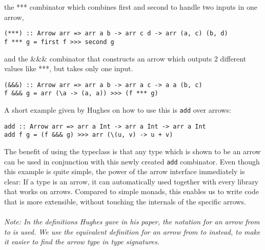 the *** combinator which combines first and second to handle two inputs in one arrow,
\begin{lstlisting}[frame=htrbl]
(***) :: Arrow arr => arr a b -> arr c d -> arr (a, c) (b, d)
f *** g = first f >>> second g
\end{lstlisting}
and the \&\&\& combinator that constructs an arrow which outputs 2 different values like ***, but takes only one input.
\begin{lstlisting}[frame=htrbl]
(&&&) :: Arrow arr => arr a b -> arr a c -> a a (b, c)
f &&& g = arr (\a -> (a, a)) >>> (f *** g)
\end{lstlisting}
A short example given by Hughes on how to use this is \lstinline{add} over arrows:
\begin{lstlisting}[frame=htrbl]
add :: Arrow arr => arr a Int -> arr a Int -> arr a Int
add f g = (f &&& g) >>> arr (\(u, v) -> u + v)
\end{lstlisting}
The benefit of using the  typeclass is that any type which is shown to be an arrow can be used in conjunction with this newly created \lstinline{add} combinator. Even though this example is quite simple, the power of the arrow interface immediately is clear: If a type is an arrow, it can automatically used together with every library that works on arrows. Compared to simple monads, this enables us to write code that is more extensible, without touching the internals of the specific arrows.
\\\\
\textit{Note: In the definitions Hughes gave in his paper, the notation  for an arrow from  to  is used. We use the equivalent definition  for an arrow from  to  instead, to make it easier to find the arrow type in type signatures.}